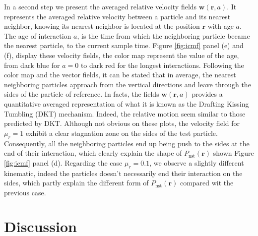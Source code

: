 \documentclass[9pt,a4paper]{article}
\begin{document}
In a second step we present the averaged relative velocity fields $\textbf{w}(\textbf{r},a)$.
It represents the averaged relative velocity between a particle and its nearest neighbor, knowing its nearest neighbor is located at the position $\textbf{r}$ with age $a$.
The age of interaction $a$, is the time from which the neighboring particle became the nearest particle, to the current sample time. 
Figure \ref{fig:icmf} panel (e) and (f), display these velocity fields, the color map represent the value of the age, from dark blue for $a = 0$ to dark red for the longest interactions. 
Following the color map and the vector fields, it can be stated that in average, the nearest neighboring particles approach from the vertical directions and leave through the sides of the particle of reference. 
In facts, the fields $\textbf{w}(\textbf{r},a)$ provides a quantitative averaged representation of what it is known as the Drafting Kissing Tumbling (DKT) mechanism.
Indeed, the relative motion seem similar to those predicted by DKT.
Although not obvious on these plots, the velocity field for $\mu_r = 1$ exhibit a clear stagnation zone on the sides of the test particle.
Consequently, all the neighboring particles end up being push to the sides at the end of their interaction, which clearly explain the shape of $P_\text{nst}(\textbf{r})$ shown Figure \ref{fig:icmf} panel (d). 
Regarding the case $\mu_r =0.1$, we observe a slightly different kinematic, indeed the particles doesn't necessarily end their interaction on the sides, which partly explain the different form of $P_\text{nst}(\textbf{r})$ compared wit the previous case.

\section{Discussion}
\vspace*{-10pt}
\end{document}
